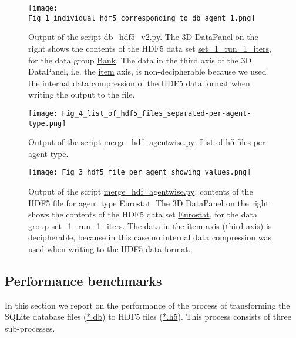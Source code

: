 \documentclass[10pt,a4paper]{article}
\begin{document}
\begin{figure}[htb!]
\centering\leavevmode
\graphicspath{{./hdf5_snapshots/}}
%
\centering\leavevmode
\texttt{[image: Fig\_1\_individual\_hdf5\_corresponding\_to\_db\_agent\_1.png]} 
\label{Fig: h5 per run contents}
\caption{\footnotesize Output of the script \url{db_hdf5_v2.py}. The 3D DataPanel on the right shows the contents of the HDF5 data set \url{set_1_run_1_iters}, for the data group \url{Bank}. The data in the third axis of the 3D DataPanel, i.e. the \url{item} axis, is non-decipherable because we used the internal data compression of the HDF5 data format when writing the output to the file.}
\end{figure}


\begin{figure}[htb!]
\centering\leavevmode
\graphicspath{{./hdf5_snapshots/}}
%
\centering\leavevmode
\texttt{[image: Fig\_4\_list\_of\_hdf5\_files\_separated-per-agent-type.png]} 
\label{Fig: h5 per agent list}
\caption{\footnotesize  Output of the script \url{merge_hdf_agentwise.py}: List of h5 files per agent type.}
\end{figure}


\begin{figure}[htb!]
\centering\leavevmode
\graphicspath{{./hdf5_snapshots/}}
%
\centering\leavevmode
\texttt{[image: Fig\_3\_hdf5\_file\_per\_agent\_showing\_values.png]} 
\label{Fig: h5 per agent contents}
\caption{\footnotesize Output of the script \url{merge_hdf_agentwise.py}; contents of the HDF5 file for agent type Eurostat. The 3D DataPanel on the right shows the contents of the HDF5 data set \url{Eurostat}, for the data group  \url{set_1_run_1_iters}. The data in the \url{item} axis (third axis) is decipherable, because in this case no internal data compression was used when writing to the HDF5 data format.}
\end{figure}


\subsection{Performance benchmarks}

In this section we report on the performance of the process of transforming the SQLite database files (\url{*.db}) to HDF5 files (\url{*.h5}).
This process consists of three sub-processes. 
\end{document}
